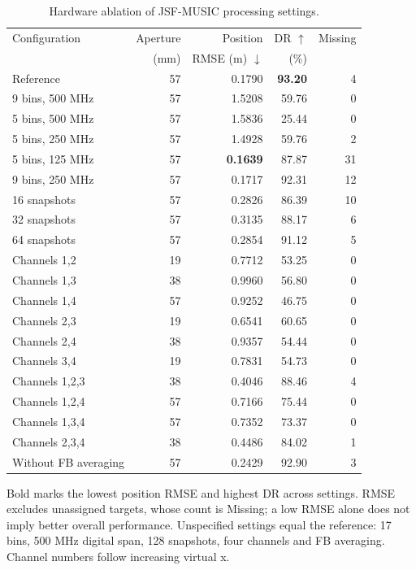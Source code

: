 \begin{table}[!t]
\centering
\caption{Hardware ablation of JSF-MUSIC processing settings.}
\label{tab:ablation}
\footnotesize
\setlength{\tabcolsep}{3pt}
\begin{tabular}{lrrrr}
\hline
Configuration & Aperture & Position & DR $\uparrow$ & Missing \\ & (mm) & RMSE (m) $\downarrow$ & (\%) & \\
\hline
Reference & 57 & 0.1790 & \textbf{93.20} & 4 \\
9 bins, 500 MHz & 57 & 1.5208 & 59.76 & 0 \\
5 bins, 500 MHz & 57 & 1.5836 & 25.44 & 0 \\
5 bins, 250 MHz & 57 & 1.4928 & 59.76 & 2 \\
5 bins, 125 MHz & 57 & \textbf{0.1639} & 87.87 & 31 \\
9 bins, 250 MHz & 57 & 0.1717 & 92.31 & 12 \\
16 snapshots & 57 & 0.2826 & 86.39 & 10 \\
32 snapshots & 57 & 0.3135 & 88.17 & 6 \\
64 snapshots & 57 & 0.2854 & 91.12 & 5 \\
Channels 1,2 & 19 & 0.7712 & 53.25 & 0 \\
Channels 1,3 & 38 & 0.9960 & 56.80 & 0 \\
Channels 1,4 & 57 & 0.9252 & 46.75 & 0 \\
Channels 2,3 & 19 & 0.6541 & 60.65 & 0 \\
Channels 2,4 & 38 & 0.9357 & 54.44 & 0 \\
Channels 3,4 & 19 & 0.7831 & 54.73 & 0 \\
Channels 1,2,3 & 38 & 0.4046 & 88.46 & 4 \\
Channels 1,2,4 & 57 & 0.7166 & 75.44 & 0 \\
Channels 1,3,4 & 57 & 0.7352 & 73.37 & 0 \\
Channels 2,3,4 & 38 & 0.4486 & 84.02 & 1 \\
Without FB averaging & 57 & 0.2429 & 92.90 & 3 \\
\hline
\end{tabular}
\par\smallskip\parbox{0.98\linewidth}{\scriptsize Bold marks the lowest position RMSE and highest DR across settings. RMSE excludes unassigned targets, whose count is Missing; a low RMSE alone does not imply better overall performance. Unspecified settings equal the reference: 17 bins, 500 MHz digital span, 128 snapshots, four channels and FB averaging. Channel numbers follow increasing virtual x.}
\end{table}
